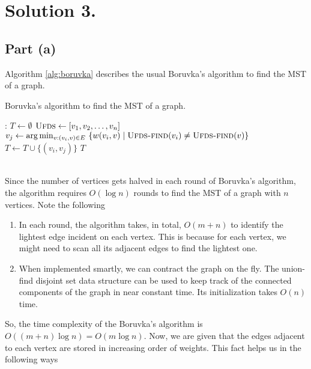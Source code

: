 \documentclass[9pt]{article}
\begin{document}
\section*{Solution 3.}
\subsection*{Part (a)}
Algorithm \ref{alg:boruvka} describes the usual Boruvka's algorithm to find the MST of a graph.
\begin{algorithm}
    \caption{Boruvka's algorithm to find the MST of a graph.}
    \label{alg:boruvka}
    \begin{algorithmic}[1]
        :
            \State $T \gets \emptyset$
            \State $\textsc{Ufds} \gets [v_{1}, v_{2}, \dots, v_{n}]$ 
                    \State $v_{j} \gets \arg\min_{v : (v_{i}, v) \in E} \ \{ w(v_{i}, v) \mid \Call{Ufds-find}{v_{i}} \neq \Call{Ufds-find}{v} \}$
                    \State $T \gets T \cup \{(v_{i}, v_{j})\}$
                    \State {}
                \EndFor
            \EndWhile
            \State \Return $T$
        \EndProcedure
    \end{algorithmic}
\end{algorithm}
\vspace*{0pt} \\
Since the number of vertices gets halved in each round of Boruvka's algorithm, the algorithm
requires $O(\log{n})$ rounds to find the MST of a graph with $n$ vertices. Note the following
\begin{enumerate}
    \item In each round, the algorithm takes, in total, $O(m + n)$ to identify the lightest
    edge incident on each vertex. This is because for each vertex, we might need to scan all its
    adjacent edges to find the lightest one.
    \item When implemented smartly, we can contract the graph on the fly. The union-find disjoint
    set data structure can be used to keep track of the connected components of the graph in near
    constant time. Its initialization takes $O(n)$ time.
\end{enumerate}
So, the time complexity of the Boruvka's algorithm is $O((m + n) \log{n}) = O(m \log{n})$.
Now, we are given that the edges adjacent to each vertex are stored in increasing order of
weights. This fact helps us in the following ways
\end{document}
